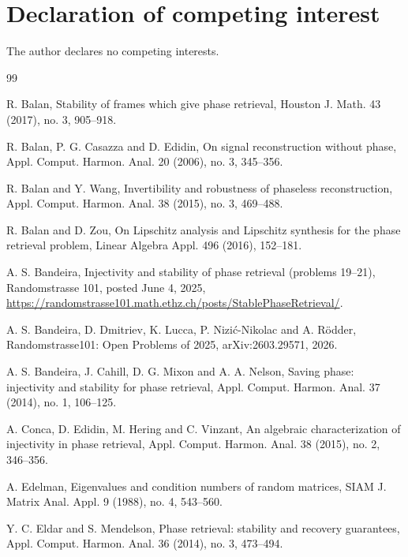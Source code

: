 \documentclass[preprint,12pt]{elsarticle}
\begin{document}
\section*{Declaration of competing interest}
The author declares no competing interests.

\begin{thebibliography}{99}

R. Balan, Stability of frames which give phase retrieval, Houston J. Math. 43 (2017), no. 3, 905--918.

R. Balan, P. G. Casazza and D. Edidin, On signal reconstruction without phase, Appl. Comput. Harmon.
Anal. 20 (2006), no. 3, 345--356.

R. Balan and Y. Wang, Invertibility and robustness of phaseless reconstruction, Appl. Comput. Harmon.
Anal. 38 (2015), no. 3, 469--488.

R. Balan and D. Zou, On Lipschitz analysis and Lipschitz synthesis for the phase retrieval problem,
Linear Algebra Appl. 496 (2016), 152--181.

A. S. Bandeira, Injectivity and stability of phase retrieval (problems 19--21), Randomstrasse 101,
posted June 4, 2025, \url{https://randomstrasse101.math.ethz.ch/posts/StablePhaseRetrieval/}.

A. S. Bandeira, D. Dmitriev, K. Lucca, P. Nizi\'c-Nikolac and A. R\"odder, Randomstrasse101: Open
Problems of 2025, arXiv:2603.29571, 2026.

A. S. Bandeira, J. Cahill, D. G. Mixon and A. A. Nelson, Saving phase: injectivity and stability for
phase retrieval, Appl. Comput. Harmon. Anal. 37 (2014), no. 1, 106--125.

A. Conca, D. Edidin, M. Hering and C. Vinzant, An algebraic characterization of injectivity in phase
retrieval, Appl. Comput. Harmon. Anal. 38 (2015), no. 2, 346--356.

A. Edelman, Eigenvalues and condition numbers of random matrices, SIAM J. Matrix Anal. Appl. 9 (1988),
no. 4, 543--560.

Y. C. Eldar and S. Mendelson, Phase retrieval: stability and recovery guarantees, Appl. Comput. Harmon.
Anal. 36 (2014), no. 3, 473--494.




\end{thebibliography}
\end{document}
